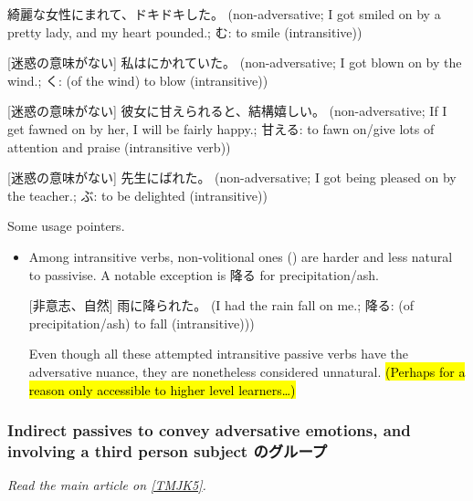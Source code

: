 \documentclass[../nihongo-gakushuu-kyouzai.tex]{subfiles}
\begin{document}
\begin{enumerate}[label=\arabic*.]
\begin{itemize}
        [迷惑の意味がない] 綺麗な女性にまれて、ドキドキした。 (non-adversative; I got smiled on by a pretty lady, and my heart pounded.; む: to smile (intransitive))

        [迷惑の意味がない] 私はにかれていた。 (non-adversative; I got blown on by the wind.; く: (of the wind) to blow (intransitive))

        [迷惑の意味がない] 彼女に甘えられると、結構嬉しい。 (non-adversative; If I get fawned on by her, I will be fairly happy.; 甘える: to fawn on/give lots of attention and praise  (intransitive verb))

        [迷惑の意味がない] 先生にばれた。 (non-adversative; I got being pleased on by the teacher.; ぶ: to be delighted (intransitive))

    \end{itemize}

    Some usage pointers.

    \begin{itemize}
        \item Among intransitive verbs, non-volitional ones () are harder and less natural to passivise. A notable exception is 降る for precipitation/ash.

        [非意志、自然] 雨に降られた。 (I had the rain fall on me.; 降る: (of precipitation/ash) to fall (intransitive)))






        Even though all these attempted intransitive passive verbs have the adversative nuance, they are nonetheless considered unnatural. \hl{(Perhaps for a reason only accessible to higher level learners\dots)}
    \end{itemize}
\end{enumerate}


\subsubsection{Indirect passives to convey adversative emotions, and involving a third person subject のグループ} \label{sec:tmjk-5-further-indirect-passives}
\emph{Read the main article on \href{https://www.tomojuku.com/blog/passive/passive-11/}{[TMJK5]}.}
\end{document}
